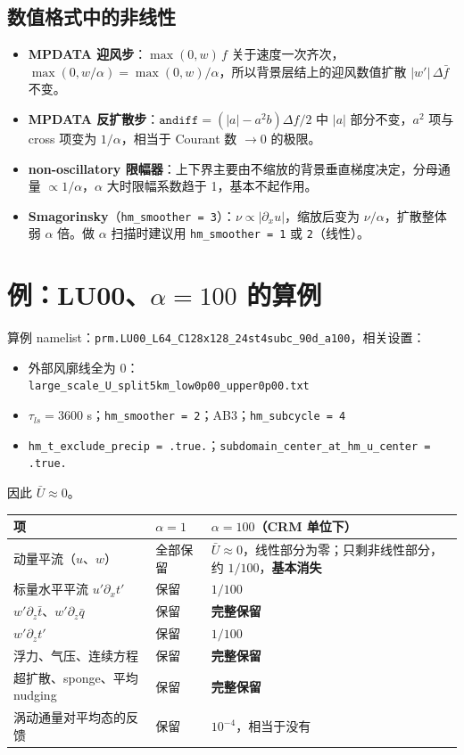 \documentclass[11pt,a4paper]{article}
\newcommand{\code}[1]{\texttt{#1}}
\begin{document}
\subsection{数值格式中的非线性}

\begin{itemize}[leftmargin=1.5em,itemsep=2pt]
\item \textbf{MPDATA 迎风步}：$\max(0,w)\,f$ 关于速度一次齐次，$\max(0,w/\alpha)=\max(0,w)/\alpha$，所以背景层结上的迎风数值扩散 $|w'|\,\Delta\bar f$ 不变。
\item \textbf{MPDATA 反扩散步}：$\code{andiff}=(|a|-a^2 b)\Delta f/2$ 中 $|a|$ 部分不变，$a^2$ 项与 cross 项变为 $1/\alpha$，相当于 Courant 数 $\to 0$ 的极限。
\item \textbf{non-oscillatory 限幅器}：上下界主要由不缩放的背景垂直梯度决定，分母通量 $\propto 1/\alpha$，$\alpha$ 大时限幅系数趋于 1，基本不起作用。
\item \textbf{Smagorinsky}（\code{hm\_smoother = 3}）：$\nu\propto|\partial_x u|$，缩放后变为 $\nu/\alpha$，扩散整体弱 $\alpha$ 倍。做 $\alpha$ 扫描时建议用 \code{hm\_smoother = 1} 或 \code{2}（线性）。
\end{itemize}

\section{例：LU00、$\alpha=100$ 的算例}

算例 namelist：\code{prm.LU00\_L64\_C128x128\_24st4subc\_90d\_a100}，相关设置：
\begin{itemize}[leftmargin=1.5em,itemsep=1pt]
\item 外部风廓线全为 0：\\ \code{large\_scale\_U\_split5km\_low0p00\_upper0p00.txt}
\item $\tau_{ls}=3600$ s；\code{hm\_smoother = 2}；AB3；\code{hm\_subcycle = 4}
\item \code{hm\_t\_exclude\_precip = .true.}；\code{subdomain\_center\_at\_hm\_u\_center = .true.}
\end{itemize}
因此 $\bar U\approx 0$。

\begin{center}
\begin{tabular}{p{6.2cm}p{2.4cm}p{6.2cm}}
\toprule
项 & $\alpha=1$ & $\alpha=100$（CRM 单位下）\\
\midrule
动量平流（$u$、$w$） & 全部保留 & $\bar U\approx0$，线性部分为零；只剩非线性部分，约 $1/100$，\textbf{基本消失} \\
标量水平平流 $u'\partial_x t'$ & 保留 & $1/100$ \\
$w'\partial_z\bar t$、$w'\partial_z\bar q$ & 保留 & \textbf{完整保留} \\
$w'\partial_z t'$ & 保留 & $1/100$ \\
浮力、气压、连续方程 & 保留 & \textbf{完整保留} \\
超扩散、sponge、平均 nudging & 保留 & \textbf{完整保留} \\
涡动通量对平均态的反馈 & 保留 & $10^{-4}$，相当于没有 \\
\bottomrule
\end{tabular}
\end{center}
\end{document}
